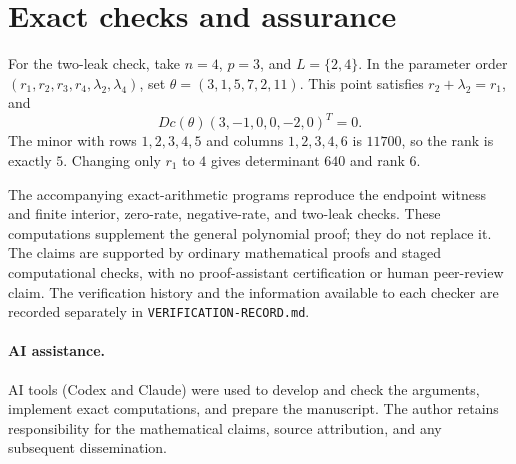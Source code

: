 \documentclass[11pt]{article}
\begin{document}
\section{Exact checks and assurance}
For the two-leak check, take \(n=4\), \(p=3\), and \(L=\{2,4\}\).
In the parameter order \((r_1,r_2,r_3,r_4,\lambda_2,\lambda_4)\), set
\(\theta=(3,1,5,7,2,11)\).
This point satisfies \(r_2+\lambda_2=r_1\), and
\[
Dc(\theta)(3,-1,0,0,-2,0)^T=0.
\]
The minor with rows \(1,2,3,4,5\) and columns \(1,2,3,4,6\) is \(11700\), so the rank is exactly \(5\). Changing only \(r_1\) to \(4\) gives determinant \(640\) and rank \(6\).

The accompanying exact-arithmetic programs reproduce the endpoint witness and finite interior, zero-rate, negative-rate, and two-leak checks. These computations supplement the general polynomial proof; they do not replace it. The claims are supported by ordinary mathematical proofs and staged computational checks, with no proof-assistant certification or human peer-review claim. The verification history and the information available to each checker are recorded separately in \texttt{VERIFICATION-RECORD.md}.

\paragraph{AI assistance.}
AI tools (Codex and Claude) were used to develop and check the arguments, implement exact computations, and prepare the manuscript. The author retains responsibility for the mathematical claims, source attribution, and any subsequent dissemination.


\appendix
\end{document}

